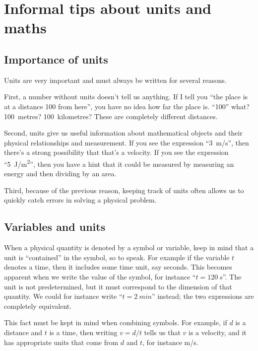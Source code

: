 \documentclass[a4paper,12pt,%
onecolumn,oneside,titlepage,%
british%
]{memoir}
\renewcommand*{\|}[1][]{\nonscript\:#1\vert\nonscript\:\mathopen{}}
\begin{document}
\section{Informal tips about units and maths}
\label{sec:units_maths}

\subsection{Importance of units}
\label{sec:importance_units}

Units are very important and must always be written for several reasons.

First, a number without units doesn't tell us anything. If I tell you \enquote{the place is at a distance 100 from here}, you have no idea how far the place is. \enquote{100} what? 100~metres? 100~kilometres? These are completely different distances.

Second, units give us useful information about mathematical objects and their physical relationships and measurement. If you see the expression \enquote{\qty{3}{m/s}}, then there's a strong possibility that that's a velocity. If you see the expression \enquote{\qty{5}{J/m^2}}, then you have a hint that it could be measured by measuring an energy and then dividing by an area.

Third, because of the previous reason, keeping track of units often allows us to quickly catch errors in solving a physical problem.

\subsection{Variables and units}
\label{sec:variables_units}

When a physical quantity is denoted by a symbol or variable, keep in mind that a unit is \enquote{contained} in the symbol, so to speak. For example if the variable $t$ denotes a time, then it includes some time unit, say seconds. This becomes apparent when we write the value of the symbol, for instance \enquote{$t=\qty{120}{s}$}. The unit is not predetermined, but it must correspond to the dimension of that quantity. We could for instance write \enquote{$t=\qty{2}{min}$} instead; the two expressions are completely equivalent.

This fact must be kept in mind when combining symbols. For example, if $d$ is a distance and $t$ is a time, then writing $v=d/t$ tells us that $v$ is a velocity, and it has appropriate units that come from $d$ and $t$, for instance \unit{m/s}.
\end{document}
